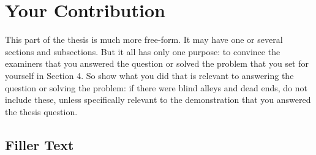 \chapter{Your Contribution}
\label{chap:contribution1}
This part of the thesis is much more free-form. It may have one or
several sections and subsections. But it all has only one purpose: to convince
the examiners that you answered the question or solved the problem that you
set for yourself in Section 4. So show what you did that is relevant to
answering the question or solving the problem: if there were blind alleys and
dead ends, do not include these, unless specifically relevant to the
demonstration that you answered the thesis question. 

\section{Filler Text}
\Blindtext




